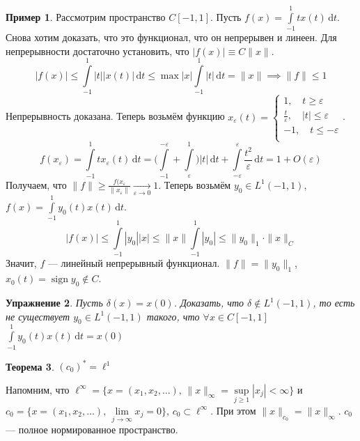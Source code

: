 \documentclass[11pt,openany,a4paper]{scrartcl}
\theoremstyle{plain}
\newtheorem{theorem}{Теорема}[section]
\newtheorem{exercise}[theorem]{Упражнение}
\theoremstyle{definition}
\newtheorem{example}[theorem]{Пример}
\newcommand{\underto}[1]{\xrightarrow[#1]{}}
\newcommand{\dif}{\, \mathrm d}
\DeclareMathOperator{\sign}{sign}
\begin{document}
\begin{example}
    Рассмотрим пространство $C[-1, 1]$. Пусть $f(x) = \int\limits_{-1}^1
    tx(t)\dif t$. Снова хотим доказать, что это функционал, что он непрерывен и 
    линеен.
    Для непрерывности достаточно установить, что $|f(x)| \equiv C\|x\|$.
    $$
    |f(x)| \leqslant \int\limits_{-1}^1 |t||x(t)|\dif t \leqslant
    \max |x| \int\limits_{-1}^1 |t|\dif t = \|x\| \implies \|f\| \leqslant 1
    $$
    Непрерывность доказана.
    Теперь возьмём функцию $x_\varepsilon(t) =
    \begin{cases}
        1,\quad t \geqslant \varepsilon \\
        \frac{t}{\varepsilon},\quad |t|\leqslant \varepsilon \\
        -1,\quad t \leqslant -\varepsilon\\
    \end{cases}$.
    $$
    f(x_\varepsilon) = \int\limits_{-1}^1 tx_\varepsilon(t)\dif t =
    \bigg(\int\limits_{-1}^{-\varepsilon} + \int\limits_\varepsilon^1\bigg)
    |t|\dif t + \int\limits_{-\varepsilon}^\varepsilon \frac{t^2}{\varepsilon}
    \dif t = 1 + O(\varepsilon)
    $$
    Получаем, что $\|f\|\geqslant \frac{f(x_\varepsilon}{\|x_\varepsilon\|}
    \underto{\varepsilon \to 0} 1$.
    Теперь возьмём
    $y_0 \in L^1(-1, 1)$, $f(x) = \int\limits_{-1}^1 y_0(t)x(t)\dif t$.
    $$
    |f(x)| \leqslant \int\limits_{-1}^1 |y_0||x| \leqslant \|x\|\int\limits_{-1}^1
    |y_0| \leqslant \|y_0\|_1\cdot \|x\|_C
    $$
    Значит, $f$ — линейный непрерывный функционал. $\|f\|=\|y_0\|_1$,
    $x_0(t) = \sign y_0 \notin C$.
\end{example}
\begin{exercise}
    Пусть $\delta(x) = x(0)$. Доказать, что $\delta \notin L^1(-1, 1)$, то есть
    не существует $y_0 \in L^1(-1, 1)$ такого, что $\forall x\in C[-1, 1]$
    $\int\limits_{-1}^1 y_0(t)x(t)\dif t = x(0)$
\end{exercise}

\begin{theorem}
    $(c_0)^\ast = \ell^1$
\end{theorem}

Напомним, что $\ell^\infty = \{x = (x_1, x_2, \ldots),\, \|x\|_\infty = 
\sup\limits_{j \geqslant 1} |x_j| < \infty\}$ и
$c_0 = \{x = (x_1, x_2, \ldots),\, \lim\limits_{j \to \infty} x_j = 0\}$,
$c_0 \subset \ell^\infty$. При этом $\|x\|_{c_0} = \|x\|_\infty$. $c_0$ — полное
нормированное пространство.
\end{document}
